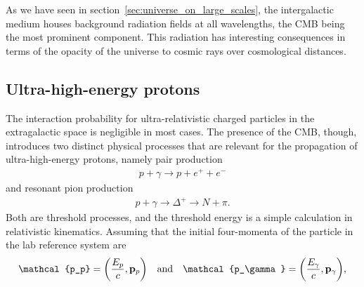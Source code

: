 As we have seen in section~\ref{sec:universe_on_large_scales}, the intergalactic
medium houses background radiation fields at all wavelengths, the CMB being the
most prominent component. This radiation has interesting consequences in terms of
the opacity of the universe to cosmic rays over cosmological distances.



\subsection{Ultra-high-energy protons}

The interaction probability for ultra-relativistic charged particles in the extragalactic
space is negligible in most cases. The presence of the CMB, though, introduces
two distinct physical processes that are relevant for the propagation of ultra-high-energy
protons, namely pair production
\begin{align*}
  p + \gamma \rightarrow p + e^+ + e^-
\end{align*}
and resonant pion production
\begin{align*}
  p + \gamma \rightarrow \Delta^+ \rightarrow N + \pi.
\end{align*}
Both are threshold processes, and the threshold energy is a simple calculation in
relativistic kinematics. Assuming that the initial four-momenta of the particle in
the lab reference system are
\begin{align*}
  \mathcal{p_p} = \qty(\frac{E_p}{c}, \vb{p}_p)
  \quad\text{and}\quad
  \mathcal{p_\gamma} = \qty(\frac{E_\gamma}{c}, \vb{p}_\gamma),
\end{align*}
